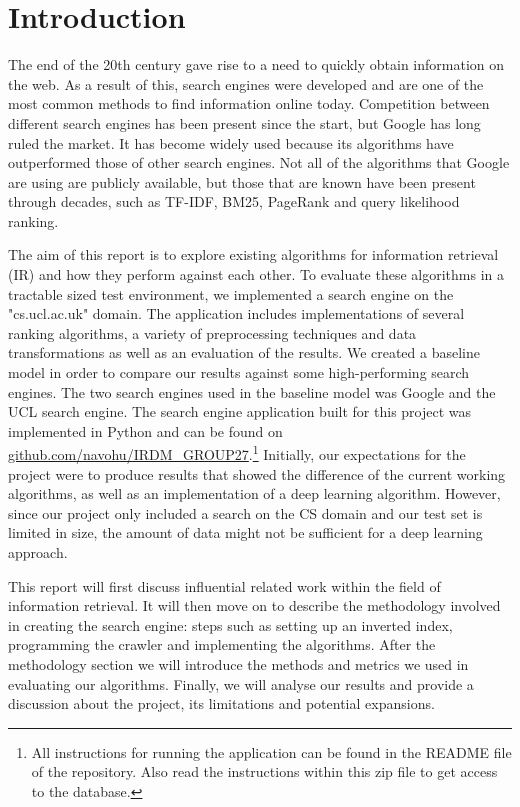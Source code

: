 \section{Introduction}

The end of the 20th century gave rise to a need to quickly obtain information on the web. As a result of this, search engines were developed and are one of the most common methods to find information online today. Competition between different search engines has been present since the start, but Google has long ruled the market. It has become widely used because its algorithms have outperformed those of other search engines. Not all of the algorithms that Google are using are publicly available, but those that are known have been present through decades, such as TF-IDF, BM25, PageRank and query likelihood ranking.

The aim of this report is to explore existing algorithms for information retrieval (IR) and how they perform against each other. To evaluate these algorithms in a tractable sized test environment, we implemented a search engine on the "cs.ucl.ac.uk" domain. The application includes implementations of several ranking algorithms, a variety of preprocessing techniques and data transformations as well as an evaluation of the results. We created a baseline model in order to compare our results against some high-performing search engines. The two search engines used in the baseline model was Google and the UCL search engine. The search engine application built for this project was implemented in Python and can be found on \url{github.com/navohu/IRDM_GROUP27}.\footnote{All instructions for running the application can be found in the README file of the repository. Also read the instructions within this zip file to get access to the database.} Initially, our expectations for the project were to produce results that showed the difference of the current working algorithms, as well as an implementation of a deep learning algorithm. However, since our project only included a search on the CS domain and our test set is limited in size, the amount of data might not be sufficient for a deep learning approach.

This report will first discuss influential related work within the field of information retrieval. It will then move on to describe the methodology involved in creating the search engine: steps such as setting up an inverted index, programming the crawler and implementing the algorithms. After the methodology section we will introduce the methods and metrics we used in evaluating our algorithms. Finally, we will analyse our results and provide a discussion about the project, its limitations and potential expansions.


